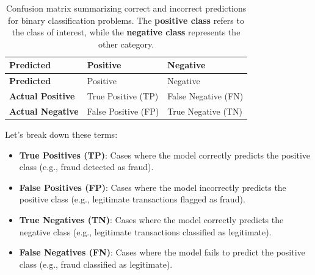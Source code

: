 \documentclass[
]{book}
\providecommand{\tightlist}{%
  \setlength{\itemsep}{0pt}\setlength{\parskip}{0pt}}
\theoremstyle{definition}
\theoremstyle{definition}
\theoremstyle{definition}
\theoremstyle{definition}
\theoremstyle{remark}
\begin{document}
\begin{longtable}[]{@{}
  >{\raggedright\arraybackslash}p{}
  >{\raggedright\arraybackslash}p{}
  >{\raggedright\arraybackslash}p{}@{}}
\caption{\label{tab:confusion-matrix} Confusion matrix summarizing correct and incorrect predictions for binary classification problems. The \textbf{positive class} refers to the class of interest, while the \textbf{negative class} represents the other category.}\tabularnewline
\toprule\noalign{}
\begin{minipage}[b]{\linewidth}\raggedright
\textbf{Predicted}
\end{minipage} & \begin{minipage}[b]{\linewidth}\raggedright
Positive
\end{minipage} & \begin{minipage}[b]{\linewidth}\raggedright
Negative
\end{minipage} \\
\midrule\noalign{}
\endfirsthead
\toprule\noalign{}
\begin{minipage}[b]{\linewidth}\raggedright
\textbf{Predicted}
\end{minipage} & \begin{minipage}[b]{\linewidth}\raggedright
Positive
\end{minipage} & \begin{minipage}[b]{\linewidth}\raggedright
Negative
\end{minipage} \\
\midrule\noalign{}
\endhead
\bottomrule\noalign{}
\endlastfoot
\textbf{Actual Positive} & { True Positive (TP) } & { False Negative (FN) } \\
\textbf{Actual Negative} & { False Positive (FP) } & { True Negative (TN) } \\
\end{longtable}

Let's break down these terms:

\begin{itemize}
\tightlist
\item
  \textbf{True Positives (TP)}: Cases where the model correctly predicts the positive class (e.g., fraud detected as fraud).\\
\item
  \textbf{False Positives (FP)}: Cases where the model incorrectly predicts the positive class (e.g., legitimate transactions flagged as fraud).\\
\item
  \textbf{True Negatives (TN)}: Cases where the model correctly predicts the negative class (e.g., legitimate transactions classified as legitimate).\\
\item
  \textbf{False Negatives (FN)}: Cases where the model fails to predict the positive class (e.g., fraud classified as legitimate).
\end{itemize}
\end{document}
